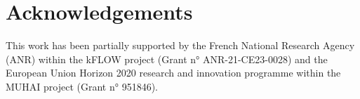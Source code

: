 \documentclass[
]{ceurart}
\begin{document}
\section*{Acknowledgements}
This work has been partially supported by the French National Research Agency (ANR) within the kFLOW project (Grant n° ANR-21-CE23-0028) and the European Union Horizon 2020 research and innovation programme within the MUHAI project (Grant n° 951846).


\end{document}
